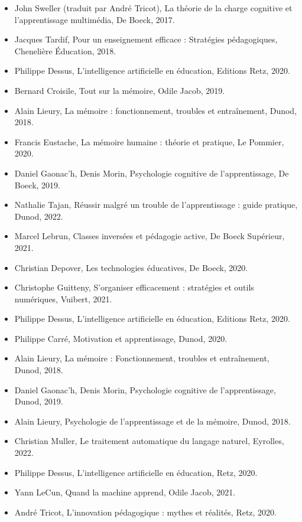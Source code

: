 \documentclass[11pt,a4paper]{report}
\begin{document}
\begin{itemize}
    \item John Sweller (traduit par André Tricot), La théorie de la charge cognitive et l'apprentissage multimédia, De Boeck, 2017.
    \item Jacques Tardif, Pour un enseignement efficace : Stratégies pédagogiques, Chenelière Éducation, 2018.
    \item Philippe Dessus, L'intelligence artificielle en éducation, Editions Retz, 2020.
    \item Bernard Croisile, Tout sur la mémoire, Odile Jacob, 2019.
    
    \item Alain Lieury, La mémoire : fonctionnement, troubles et entraînement, Dunod, 2018.
    \item Francis Eustache, La mémoire humaine : théorie et pratique, Le Pommier, 2020.
    \item Daniel Gaonac'h, Denis Morin, Psychologie cognitive de l'apprentissage, De Boeck, 2019.
    \item Nathalie Tajan, Réussir malgré un trouble de l’apprentissage : guide pratique, Dunod, 2022.
    
    \item Marcel Lebrun, Classes inversées et pédagogie active, De Boeck Supérieur, 2021.
    \item Christian Depover, Les technologies éducatives, De Boeck, 2020.
    \item Christophe Guitteny, S'organiser efficacement : stratégies et outils numériques, Vuibert, 2021.
    \item Philippe Dessus, L'intelligence artificielle en éducation, Editions Retz, 2020.

    \item Philippe Carré, Motivation et apprentissage, Dunod, 2020.
    \item Alain Lieury, La mémoire : Fonctionnement, troubles et entraînement, Dunod, 2018.
    \item Daniel Gaonac’h, Denis Morin, Psychologie cognitive de l’apprentissage, Dunod, 2019.
    \item Alain Lieury, Psychologie de l’apprentissage et de la mémoire, Dunod, 2018.
    
    \item Christian Muller, Le traitement automatique du langage naturel, Eyrolles, 2022.
    \item Philippe Dessus, L'intelligence artificielle en éducation, Retz, 2020.
    \item Yann LeCun, Quand la machine apprend, Odile Jacob, 2021.
    \item André Tricot, L'innovation pédagogique : mythes et réalités, Retz, 2020.
    

\end{itemize}
\end{document}
